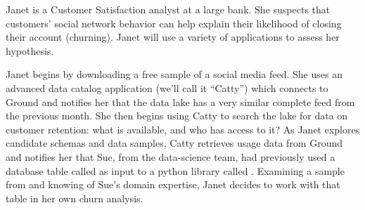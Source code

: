 \documentclass{sig-alternate}
\begin{document}

Janet is a Customer Satisfaction analyst at a large bank. She suspects that customers' social network behavior can help explain their likelihood of closing their account (churning). 
Janet will use a variety of applications to assess her hypothesis. 

Janet 
begins by downloading a free sample of a social media feed. She uses an advanced data catalog application (we'll call it ``Catty'') which connects to Ground 
and notifies her that the data lake has a very similar complete feed from the previous month. 
She then begins using Catty to search the lake for data on customer retention: what is available, and who has access to it?  
As Janet explores candidate schemas and data samples, Catty retrieves usage data from Ground and notifies her that Sue, from the data-science team, had previously used a database table called  as input to a python library called .
Examining a sample from  and knowing of Sue's domain expertise, Janet decides to work with that table in her own churn analysis.  
\end{document}
